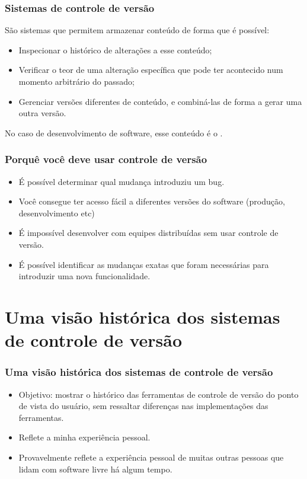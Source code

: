 \documentclass{beamer}
\begin{document}
\begin{frame}
  \frametitle{Sistemas de controle de versão}

  São sistemas que permitem armazenar conteúdo de forma que é possível:
  \pause

  \begin{itemize}
    \item Inspecionar o histórico de alterações a esse conteúdo;
      \pause
    \item Verificar o teor de uma alteração específica que pode ter
      acontecido num momento arbitrário do passado;
      \pause
    \item Gerenciar versões diferentes de conteúdo, e combiná-las de
      forma a gerar uma outra versão.
  \end{itemize}

  \pause
  No caso de desenvolvimento de software, esse conteúdo é o
  .

\end{frame}

\begin{frame}
  \frametitle{Porquê você deve usar controle de versão}
  
  \begin{itemize}
      \pause
    \item É possível determinar qual mudança introduziu um bug.
      \pause
    \item Você consegue ter acesso fácil a diferentes versões do software (produção,
      desenvolvimento etc)
      \pause
    \item É impossível desenvolver com equipes distribuídas sem usar
      controle de versão.
      \pause
    \item É possível identificar as mudanças exatas que foram necessárias
      para introduzir uma nova funcionalidade.
  \end{itemize}
\end{frame}

\section[Histórico]{Uma visão histórica dos sistemas de controle de versão}

\begin{frame}
  \frametitle{Uma visão histórica dos sistemas de controle de versão}

  \pause
  \begin{itemize}
    \item Objetivo: mostrar o histórico das ferramentas de controle de
      versão do ponto de vista do usuário, sem ressaltar diferenças nas
      implementações das ferramentas.
      \pause
    \item Reflete a minha experiência pessoal.
      \pause
    \item Provavelmente reflete a experiência pessoal de muitas outras
      pessoas que lidam com software livre há algum tempo.
  \end{itemize}
\end{frame}
\end{document}
